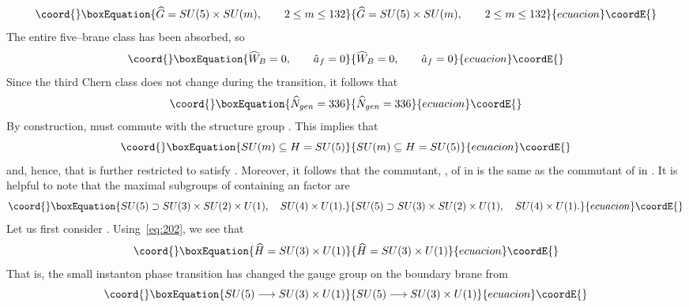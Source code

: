 \documentclass[a4paper,12pt]{article}
\numberwithin{equation}{section}
\theoremstyle{plain}
\begin{document}
\begin{equation}\coord{}\boxEquation{
\widehat{G}= SU(5) \times SU(m), \qquad 2 \leq m \leq 132
\label{eq:198}
}{
\widehat{G}= SU(5) \times SU(m), \qquad 2 \leq m \leq 132
}{ecuacion}\coordE{}\end{equation}
The entire five--brane class has been absorbed, so 
\begin{equation}\coord{}\boxEquation{
\widehat{W}_{B}=0, \qquad \hat{a}_{f}=0
\label{eq:199}
}{
\widehat{W}_{B}=0, \qquad \hat{a}_{f}=0
}{ecuacion}\coordE{}\end{equation}
Since the third Chern class does not change during the transition, it follows
that
\begin{equation}\coord{}\boxEquation{
\widehat{N}_{gen}=336
\label{eq:200}
}{
\widehat{N}_{gen}=336
}{ecuacion}\coordE{}\end{equation}
By construction, \coordHE{} must commute with the structure group \coordHE{}.
This implies that 
\begin{equation}\coord{}\boxEquation{
SU(m) \subseteq H =SU(5)
\label{eq:201}
}{
SU(m) \subseteq H =SU(5)
}{ecuacion}\coordE{}\end{equation}
and, hence, that \coordHE{} is further restricted to satisfy \coordHE{}. 
Moreover, it follows that the commutant, \coordHE{}, of \coordHE{} 
in \coordHE{} is the same as the commutant of \coordHE{} in \coordHE{}. It is helpful to
note that the maximal subgroups of \coordHE{} containing an \coordHE{} factor are 
\begin{equation}\coord{}\boxEquation{
SU(5) \supset SU(3) \times SU(2) \times U(1), \quad SU(4) \times U(1).
\label{eq:202}
}{
SU(5) \supset SU(3) \times SU(2) \times U(1), \quad SU(4) \times U(1).
}{ecuacion}\coordE{}\end{equation}
Let us first consider \coordHE{}. Using~\eqref{eq:202}, we see that 
\begin{equation}\coord{}\boxEquation{
\widehat{H}=SU(3)\times U(1)
\label{eq:203}
}{
\widehat{H}=SU(3)\times U(1)
}{ecuacion}\coordE{}\end{equation}
That is, the small instanton phase transition has changed the gauge
group on the boundary brane from
\begin{equation}\coord{}\boxEquation{
SU(5) \longrightarrow SU(3)\times U(1)
\label{eq:204}
}{
SU(5) \longrightarrow SU(3)\times U(1)
}{ecuacion}\coordE{}\end{equation}
\end{document}
